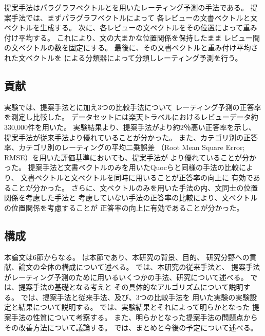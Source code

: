 提案手法はパラグラフベクトルと\nn を用いたレーティング予測の手法である。
提案手法では、まずパラグラフベクトル\cite{quoc14}によって
各レビューの文書ベクトルと文ベクトルを生成する。
次に、各レビューの文ベクトルをその位置によって重み付け平均する。
これにより、文の大まかな位置関係を保持したまま
レビュー間の文ベクトルの数を固定にする。
最後に、その文書ベクトルと重み付け平均された文ベクトルを
\nn による分類器によって分類しレーティング予測を行う。


\subsection{貢献}

実験では、提案手法と\rival に加え3つの比較手法について
レーティング予測の正答率を測定し比較した。
データセットには楽天トラベルにおけるレビューデータ約330,000件を用いた。
実験結果より、提案手法が\rival より約2％高い正答率を示し、
提案手法が従来手法より優れていることが分かった。
また、カテゴリ別の正答率、カテゴリ別のレーティングの平均二乗誤差
（Root Mean Square Error; RMSE）を用いた評価基準においても、提案手法が
\rival より優れていることが分かった。
提案手法と文書ベクトルのみを用いたQuocら\cite{quoc14}と同様の手法の比較により、
文書ベクトルと文ベクトルを同時に用いることが正答率の向上に
有効であることが分かった。
さらに、文ベクトルのみを用いた手法の内、文同士の位置関係を考慮した手法と
考慮していない手法の正答率の比較により、文ベクトルの位置関係を考慮することが
正答率の向上に有効であることが分かった。


\subsection{構成}

本論文は6節からなる。
は本節であり、本研究の背景、目的、
研究分野への貢献、論文の全体の構成について述べる。
では、本研究の従来手法\cite{fujitani15}と、
提案手法がレーティング予測のために用いるいくつかの手法、研究について述べる。
では、提案手法の基礎となる考えと
その具体的なアルゴリズムについて説明する。
では、提案手法と従来手法、及び、3つの比較手法を
用いた実験の実験設定と結果について説明する。
では、実験結果とそれによって明らかとなった
提案手法の性質について考察する。
また、明らかとなった提案手法の問題点からその改善方法について議論する。
では、まとめと今後の予定について述べる。
